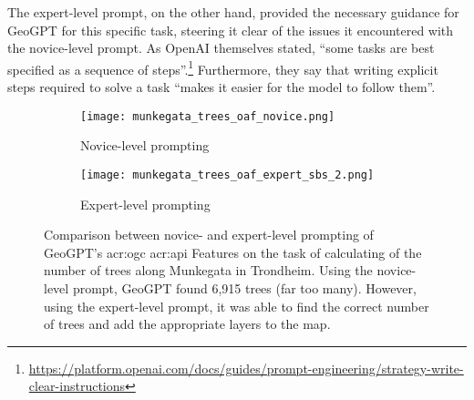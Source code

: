 The expert-level prompt, on the other hand, provided the necessary guidance for GeoGPT for this specific task, steering it clear of the issues it encountered with the novice-level prompt. As OpenAI themselves stated, \enquote{some tasks are best specified as a sequence of steps}.\footnote{\url{https://platform.openai.com/docs/guides/prompt-engineering/strategy-write-clear-instructions}} Furthermore, they say that writing explicit steps required to solve a task \enquote{makes it easier for the model to follow them}.

\begin{figure}[htbp]
    \centering
    \begin{subfigure}[b]{0.7\textwidth}
        \centering
        \texttt{[image: munkegata\_trees\_oaf\_novice.png]}
        \caption{Novice-level prompting}
        \label{fig:novice-level-prompting-munkegata-trees}
    \end{subfigure}
    \hfill
    \begin{subfigure}[b]{0.7\textwidth}
        \centering
        \texttt{[image: munkegata\_trees\_oaf\_expert\_sbs\_2.png]}
        \caption{Expert-level prompting}
        \label{fig:expert-level-prompting-munkegata-trees}
    \end{subfigure}
    \caption[Comparison between novice- and expert-level prompting of GeoGPT for calculating the number of trees along Munkegata in Trondheim.]{Comparison between novice- and expert-level prompting of GeoGPT's \acrshort{acr:ogc} \acrshort{acr:api} Features on the task of calculating of the number of trees along Munkegata in Trondheim. Using the novice-level prompt, GeoGPT found 6,915 trees (far too many). However, using the expert-level prompt, it was able to find the correct number of trees and add the appropriate layers to the map.
    }
    \label{fig:novice-vs-expert-munkegata-trees}
\end{figure}


\glsresetall